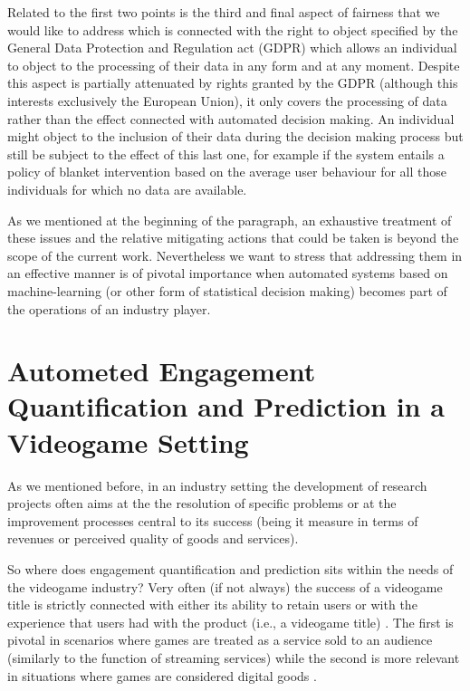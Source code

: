 Related to the first two points is the third and final aspect of fairness that we would like to address which is connected with the right to object specified by the General Data Protection and Regulation act (GDPR) \cite{EUdataregulations2018} which allows an individual to object to the processing of their data in any form and at any moment. Despite this aspect is partially attenuated by rights granted by the GDPR (although this interests exclusively the European Union), it only covers the processing of data rather than the effect connected with automated decision making. An individual might object to the inclusion of their data during the decision making process but still be subject to the effect of this last one, for example if the system entails a policy of blanket intervention based on the average user behaviour for all those individuals for which no data are available.

As we mentioned at the beginning of the paragraph, an exhaustive treatment of these issues and the relative mitigating actions that could be taken is beyond the scope of the current work. Nevertheless we want to stress that addressing them in an effective manner is of pivotal importance when automated systems based on machine-learning (or other form of statistical decision making) becomes part of the operations of an industry player.

\section{Autometed Engagement Quantification and Prediction in a Videogame Setting}
\label{industry_needs}
As we mentioned before, in an industry setting the development of research projects often aims at the the resolution of specific problems or at the improvement processes central to its success (being it measure in terms of revenues or perceived quality of goods and services). 

So where does engagement quantification and prediction sits within the needs of the videogame industry? Very often (if not always) the success of a videogame title is strictly connected with either its ability to retain users or with the experience that users had with the product (i.e., a videogame title) \cite{amit2001value, alomari2016mobile}. The first is pivotal in scenarios where games are treated as a service sold to an audience (similarly to the function of streaming services) while the second is more relevant in situations where games are considered digital goods \cite{amit2001value, alomari2016mobile}. 

